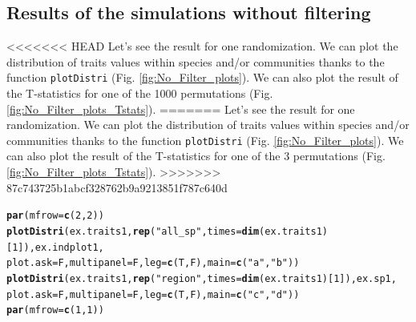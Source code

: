 \documentclass[12pt]{article}\usepackage[]{graphicx}\usepackage[]{color}
\makeatletter
\newcommand{\hlnum}[1]{\textcolor[rgb]{0.686,0.059,0.569}{#1}}%
\newcommand{\hlstr}[1]{\textcolor[rgb]{0.192,0.494,0.8}{#1}}%
\newcommand{\hlstd}[1]{\textcolor[rgb]{0.345,0.345,0.345}{#1}}%
\newcommand{\hlkwc}[1]{\textcolor[rgb]{0.333,0.667,0.333}{#1}}%
\newcommand{\hlkwd}[1]{\textcolor[rgb]{0.737,0.353,0.396}{\textbf{#1}}}%
\newenvironment{kframe}{%
 \def\at@end@of@kframe{}%
 \ifinner\ifhmode%
  \def\at@end@of@kframe{\end{minipage}}%
  \begin{minipage}{\columnwidth}%
 \fi\fi%
 \def\FrameCommand##1{\hskip\@totalleftmargin \hskip-\fboxsep
 \colorbox{shadecolor}{##1}\hskip-\fboxsep
     \hskip-\linewidth \hskip-\@totalleftmargin \hskip\columnwidth}%
 \MakeFramed {\advance\hsize-\width
   \@totalleftmargin\z@ \linewidth\hsize
   \@setminipage}}%
 {\par\unskip\endMakeFramed%
 \at@end@of@kframe}
\newenvironment{knitrout}{}{} %
\makeatother
\begin{document}
\begin{landscape}
  \subsection {Results of the simulations without filtering}
<<<<<<< HEAD
Let's see the result for one randomization. We can plot the distribution of traits values within species and/or communities thanks to the function \texttt{plotDistri} (Fig. \ref{fig:No_Filter_plots}). We can also plot the result of the T-statistics for one of the 1000 permutations (Fig. \ref{fig:No_Filter_plots_Tstats}).
=======
Let's see the result for one randomization. We can plot the distribution of traits values within species and/or communities thanks to the function \texttt{plotDistri} (Fig. \ref{fig:No_Filter_plots}). We can also plot the result of the T-statistics for one of the 3 permutations (Fig. \ref{fig:No_Filter_plots_Tstats}).
>>>>>>> 87c743725b1abcf328762b9a9213851f787c640d

\begin{knitrout}\small
{}\color{fgcolor}\begin{kframe}
\begin{alltt}
\hlkwd{par}\hlstd{(}\hlkwc{mfrow}\hlstd{=}\hlkwd{c}\hlstd{(}\hlnum{2}\hlstd{,} \hlnum{2}\hlstd{))}
\hlkwd{plotDistri}\hlstd{(ex.traits1,} \hlkwd{rep}\hlstd{(}\hlstr{"all_sp"}\hlstd{,} \hlkwc{times} \hlstd{=} \hlkwd{dim}\hlstd{(ex.traits1)[}\hlnum{1}\hlstd{]), ex.indplot1,}
           \hlkwc{plot.ask} \hlstd{= F,} \hlkwc{multipanel} \hlstd{= F,} \hlkwc{leg} \hlstd{=}\hlkwd{c}\hlstd{(T, F),} \hlkwc{main} \hlstd{=} \hlkwd{c}\hlstd{(}\hlstr{"a"}\hlstd{,} \hlstr{"b"}\hlstd{))}
\hlkwd{plotDistri}\hlstd{(ex.traits1,} \hlkwd{rep}\hlstd{(}\hlstr{"region"}\hlstd{,} \hlkwc{times} \hlstd{=} \hlkwd{dim}\hlstd{(ex.traits1)[}\hlnum{1}\hlstd{]), ex.sp1,}
           \hlkwc{plot.ask} \hlstd{= F,} \hlkwc{multipanel} \hlstd{= F,} \hlkwc{leg} \hlstd{=}\hlkwd{c}\hlstd{(T, F),} \hlkwc{main} \hlstd{=} \hlkwd{c}\hlstd{(}\hlstr{"c"}\hlstd{,} \hlstr{"d"}\hlstd{))}
\hlkwd{par}\hlstd{(}\hlkwc{mfrow}\hlstd{=}\hlkwd{c}\hlstd{(}\hlnum{1}\hlstd{,} \hlnum{1}\hlstd{))}
\end{alltt}
\end{kframe}\begin{figure}


\end{figure}
\end{knitrout}
\end{landscape}
\end{document}
